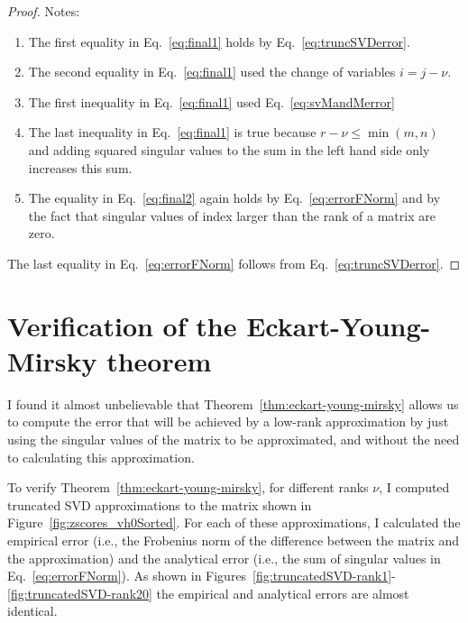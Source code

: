\documentclass[12pt]{article}
\begin{document}
\begin{appendices}
\begin{proof}
        Notes:
        \begin{enumerate}
            \item The first equality in Eq.~\ref{eq:final1} holds by
                Eq.~\ref{eq:truncSVDerror}.
            \item The second equality in Eq.~\ref{eq:final1} used the change of
                variables $i=j-\nu$.
            \item The first inequality in Eq.~\ref{eq:final1} used
                Eq.~\ref{eq:svMandMerror}
            \item The last inequality in Eq.~\ref{eq:final1} is true because
                $r-\nu\leq\min(m,n)$ and adding squared singular values to the sum in
                the left hand side only increases this sum.
            \item The equality in Eq.~\ref{eq:final2} again holds by
                Eq.~\ref{eq:errorFNorm} and by the fact that singular values of
                index larger than the rank of a matrix are zero.
        \end{enumerate}

        The last equality in Eq.~\ref{eq:errorFNorm} follows from
        Eq.~\ref{eq:truncSVDerror}.

    \end{proof}

\section{Verification of the Eckart-Young-Mirsky theorem}
\label{sec:verificationEckartYoungMirsky}

I found it almost unbelievable that Theorem~\ref{thm:eckart-young-mirsky} allows
us to compute the error that will be achieved by a low-rank approximation by
just using the singular values of the matrix to be approximated, and without
the need to calculating this approximation.

To verify Theorem~\ref{thm:eckart-young-mirsky}, for different ranks $\nu$, I
computed truncated SVD approximations to the matrix shown in
Figure~\ref{fig:zscores_vh0Sorted}. For each of these approximations, I
calculated the empirical error (i.e., the Frobenius norm of the difference between
the matrix and the approximation) and the analytical error (i.e., the sum of
singular values in Eq.~\ref{eq:errorFNorm}). As shown in
Figures~\ref{fig:truncatedSVD-rank1}-\ref{fig:truncatedSVD-rank20}
the empirical and analytical errors are almost identical.


\end{appendices}
\end{document}

